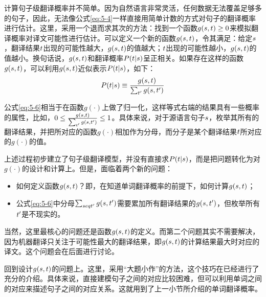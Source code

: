 \parinterval 计算句子级翻译概率并不简单。因为自然语言非常灵活，任何数据无法覆盖足够多的句子，因此，无法像公式\eqref{eq:5-4}一样直接用简单计数的方式对句子的翻译概率进行估计。这里，采用一个退而求其次的方法：找到一个函数$g({s},{t})\ge 0$来模拟翻译概率对译文可能性进行估计。可以定义一个新的函数$g({s},{t})$，令其满足：给定${s}$，翻译结果${t}$出现的可能性越大，$g({s},{t})$的值越大；${t}$出现的可能性越小，$g({s},{t})$的值越小。换句话说，$g({s},{t})$和翻译概率${P}({t}|{s})$呈正相关。如果存在这样的函数$g({s},{t}
)$，可以利用$g({s},{t})$近似表示${P}({t}|{s})$，如下：
\begin{eqnarray}
{P}({t}|{s})  \equiv  \frac{g({s},{t})}{\sum_{{t}'}g({s},{t}')}
\label{eq:5-6}
\end{eqnarray}

\parinterval 公式\eqref{eq:5-6}相当于在函数$g(\cdot)$上做了归一化，这样等式右端的结果具有一些概率的属性，比如，$0 \le \frac{g({s},{t})}{\sum_{{t'}}g({s},{t'})} \le 1$。具体来说，对于源语言句子${s}$，枚举其所有的翻译结果，并把所对应的函数$g(\cdot)$相加作为分母，而分子是某个翻译结果${t}$所对应的$g(\cdot)$的值。

\parinterval 上述过程初步建立了句子级翻译模型，并没有直接求${P}({t}|{s})$，而是把问题转化为对$g(\cdot)$的设计和计算上。但是，面临着两个新的问题：

\begin{itemize}
\vspace{0.5em}
\item 如何定义函数$g({s},{t})$？即，在知道单词翻译概率的前提下，如何计算$g({s},{t})$；
\vspace{0.5em}
\item 公式\eqref{eq:5-6}中分母$\sum_{seq{t'}}g({s},{{t}'})$需要累加所有翻译结果的$g({s},{{t}'})$，但枚举所有${{t}'}$是不现实的。
\vspace{0.5em}
\end{itemize}

\parinterval  当然，这里最核心的问题还是函数$g({s},{t})$的定义。而第二个问题其实不需要解决，因为机器翻译只关注于可能性最大的翻译结果，即$g({s},{t})$的计算结果最大时对应的译文。这个问题会在后面进行讨论。

\parinterval 回到设计$g({s},{t})$的问题上。这里，采用“大题小作”的方法，这个技巧在{\chaptertwo}已经进行了充分的介绍。具体来说，直接建模句子之间的对应比较困难，但可以利用单词之间的对应来描述句子之间的对应关系。这就用到了上一小节所介绍的单词翻译概率。

